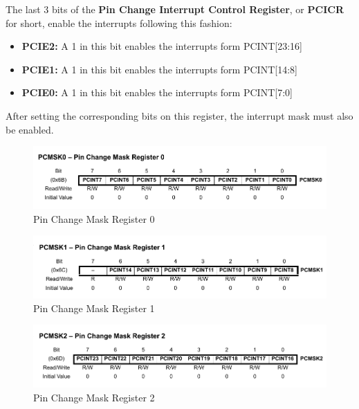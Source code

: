 The last 3 bits of the \textbf{Pin Change Interrupt Control Register}, or \textbf{PCICR} for short, enable the interrupts following this fashion:

\begin{itemize}
    \item \textbf{PCIE2:} A 1 in this bit enables the interrupts form PCINT[23:16]
    \item \textbf{PCIE1:} A 1 in this bit enables the interrupts form PCINT[14:8]
    \item \textbf{PCIE0:} A 1 in this bit enables the interrupts form PCINT[7:0]
\end{itemize}

\clearpage

After setting the corresponding bits on this register, the interrupt mask must also be enabled.\medskip

\begin{figure}[H]
    \centering
    \includegraphics[width = \textwidth]{Graphics/MICROS/Practice 3/DATASHEET/PCMSK0.pdf}
    \caption{Pin Change Mask Register 0~\autocite{ATMEGA328P}}
    \label{fig:PCMSK0}
\end{figure}

\vspace{-0.5cm}

\begin{figure}[H]
    \centering
    \includegraphics[width = \textwidth]{Graphics/MICROS/Practice 3/DATASHEET/PCMSK1.pdf}
    \caption{Pin Change Mask Register 1~\autocite{ATMEGA328P}}
    \label{fig:PCMSK1}
\end{figure}

\vspace{-0.5cm}

\begin{figure}[H]
    \centering
    \includegraphics[width = \textwidth]{Graphics/MICROS/Practice 3/DATASHEET/PCMSK2.pdf}
    \caption{Pin Change Mask Register 2~\autocite{ATMEGA328P}}
    \label{fig:PCMSK2}
\end{figure}


